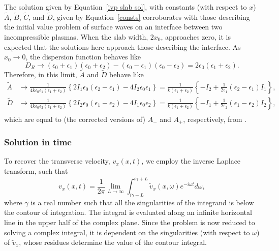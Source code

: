 \documentclass{aastex61}
\begin{document}
The solution given by Equation~\eqref{ivp slab sol}, with constants (with respect to $x$) $\tilde{A}$, $\tilde{B}$, $\tilde{C}$, and $\tilde{D}$, given by Equation~\eqref{consts} corroborates with those describing the initial value problem of surface waves on an interface between two incompressible plasmas. When the slab width, $2x_0$, approaches zero, it is expected that the solutions here approach those describing the interface. As $x_ 0 \to 0$, the dispersion function behaves like
\begin{equation}
D_R \to (\epsilon_0 + \epsilon_1)(\epsilon_0 + \epsilon_2) - (\epsilon_0 - \epsilon_1)(\epsilon_0 - \epsilon_2) = 2\epsilon_0(\epsilon_1 + \epsilon_2).
\end{equation}
Therefore, in this limit, $\tilde{A}$ and $\tilde{D}$ behave like
\begin{align}
\tilde{A} &\to \frac{1}{4k\epsilon_0\epsilon_1(\epsilon_1 + \epsilon_2)} \left\{ 2I_1\epsilon_0(\epsilon_2 - \epsilon_1) - 4I_2\epsilon_0\epsilon_1 \right\} = \frac{1}{k(\epsilon_1 + \epsilon_2)} \left\{ -I_2 + \frac{1}{2\epsilon_1}(\epsilon_2 - \epsilon_1)I_1 \right\}, \\
\tilde{D} &\to \frac{1}{4k\epsilon_0\epsilon_2(\epsilon_1 + \epsilon_2)} \left\{ 2I_2\epsilon_0(\epsilon_1 - \epsilon_2) - 4I_1\epsilon_0\epsilon_2 \right\} = \frac{1}{k(\epsilon_1 + \epsilon_2)} \left\{ -I_1 + \frac{1}{2\epsilon_2}(\epsilon_1 - \epsilon_2)I_2 \right\}, \\
\end{align}
which are equal to (the corrected versions of) $A_-$ and $A_+$, respectively, from \cite{rae_etal81}.



\subsubsection{Solution in time}

To recover the transverse velocity, $v_x(x, t)$, we employ the inverse Laplace transform, such that
\begin{equation}
v_x(x,t) = \frac{1}{2\pi} \lim_{L \to \infty} \int_{i\gamma - L}^{i\gamma + L} \tilde{v}_x(x,\omega) e^{-i\omega t} d\omega,
\end{equation}
where $\gamma$ is a real number such that all the singularities of the integrand is below the contour of integration. The integral is evaluated along an infinite horizontal line in the upper half of the complex plane. Since the problem is now reduced to solving a complex integral, it is dependent on the singularities (with respect to $\omega$) of $\tilde{v}_x$, whose residues determine the value of the contour integral.
\end{document}
